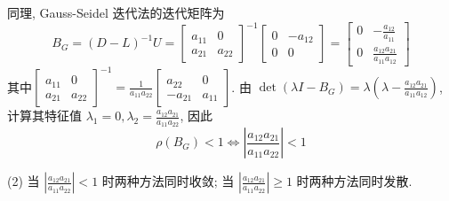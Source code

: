 \begin{tcolorbox}
同理, Gauss-Seidel 迭代法的迭代矩阵为  
$$
B_{G}=(D-L)^{-1}U=\left[\begin{array}{cc}
a_{11} & 0 \\
a_{21} & a_{22}
\end{array}\right]^{-1}\left[\begin{array}{cc}
0 & -a_{12} \\
0 & 0
\end{array}\right]=\left[\begin{array}{cc}
0 & -\frac{a_{12}}{a_{11}} \\
0 & \frac{a_{12} a_{21}}{a_{11} a_{12}}
\end{array}\right]
$$
其中$\left[\begin{array}{cc}
a_{11} & 0 \\
a_{21} & a_{22}
\end{array}\right]^{-1}=\frac{1}{a_{11}a_{22}}\left[\begin{array}{cc}
a_{22} & 0 \\
-a_{21} & a_{11}
\end{array}\right]$. 由 $ \operatorname{det}\left(\lambda I-B_{G}\right)=\lambda\left(\lambda-\frac{a_{12} a_{21}}{a_{11} a_{12}}\right) $, 计算其特征值 $ \lambda_{1}=0, \lambda_{2}=\frac{a_{12} a_{21}}{a_{11} a_{22}} $, 因此
$$
\rho\left(B_{G}\right)<1\iff \left|\frac{a_{12} a_{21}}{a_{11} a_{22}}\right|<1
$$

(2) 当 $|\frac{a_{12} a_{21}}{a_{11} a_{22}}|<1$ 时两种方法同时收敛; 当 $|\frac{a_{12} a_{21}}{a_{11} a_{22}}| \geqslant 1$ 时两种方法同时发散.
\end{tcolorbox}

